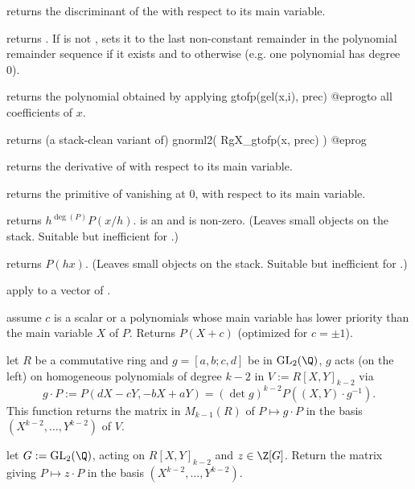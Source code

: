  returns the discriminant of the  
with respect to its main variable.

 returns
. If  is not , sets it to the last
non-constant remainder in the polynomial remainder sequence if it exists and to
 otherwise (e.g. one polynomial has degree 0).


 returns the polynomial obtained by
applying
\bprog
  gtofp(gel(x,i), prec)
@eprog\noindent to all coefficients of $x$.

 returns (a stack-clean variant of)
\bprog
  gnorml2( RgX_gtofp(x, prec) )
@eprog

 returns the derivative of  with respect to
its main variable.

 returns the primitive of  vanishing at
$0$, with respect to its main variable.

 returns $h^{\deg(P)} P(x/h)$.
 is an  and  is non-zero. (Leaves small objects on the
stack. Suitable but inefficient for .)

 returns $P(h x)$. (Leaves small objects
on the stack. Suitable but inefficient for .)

 apply  to a vector
of .

 assume $c$ is a scalar or
a polynomials whose main variable has lower priority than the main variable
$X$ of $P$. Returns $P(X + c)$ (optimized for $c = \pm 1$).


 let $R$ be a commutative ring
and $g = [a,b;c,d]$ be in $\text{GL}_2(\Q)$, $g$ acts (on the left)
on homogeneous polynomials of degree $k-2$ in $V := R[X,Y]_{k-2}$ via
$$ g\cdot P := P(dX-cY, -bX+aY) = (\det g)^{k-2} P((X,Y)\cdot g^{-1}).$$
This function returns the matrix in $M_{k-1}(R)$ of $P\mapsto g\cdot P$ in
the basis $(X^{k-2},\dots,Y^{k-2})$ of $V$.

 let $G:=\text{GL}_2(\Q)$, acting
on $R[X,Y]_{k-2}$ and $z\in \Z[G]$. Return the matrix giving
$P\mapsto z\cdot P$ in the basis $(X^{k-2},\dots,Y^{k-2})$.

